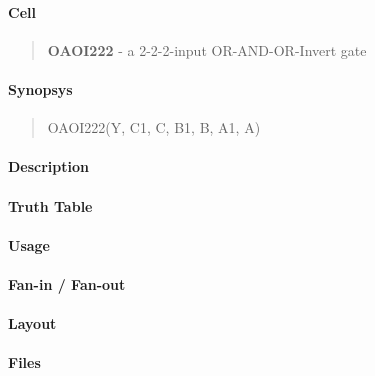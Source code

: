 \label{OAOI222}
\paragraph{Cell}
\begin{quote}
    \textbf{OAOI222} - a 2-2-2-input OR-AND-OR-Invert gate
\end{quote}

\paragraph{Synopsys}
\begin{quote}
    OAOI222(Y, C1, C, B1, B, A1, A)
\end{quote}

\paragraph{Description}

%

\paragraph{Truth Table}
%

\paragraph{Usage}

\paragraph{Fan-in / Fan-out}

\paragraph{Layout}

\paragraph{Files}
